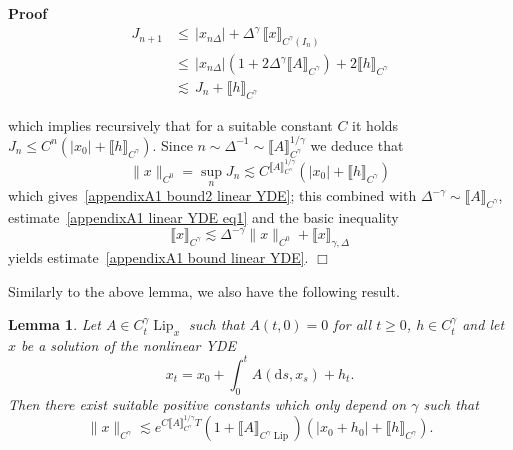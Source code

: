 \documentclass[10pt]{article}
\newcommand{\mathd}{\mathrm{d}}
\newcommand{\tmop}[1]{\ensuremath{\operatorname{#1}}}
\newenvironment{proof}{\noindent\textbf{Proof\ }}{\hspace*{\fill}$\Box$\medskip}
\newtheorem{lemma}{Lemma}
\begin{document}
\begin{proof}
  \begin{align*}
    J_{n + 1} & \leqslant \, | x_{n \Delta} | + \Delta^{\gamma} \, \llbracket
    x \rrbracket_{C^{\gamma} (I_n)}\\
    & \leqslant \, | x_{n \Delta} | (1 + 2 \Delta^{\gamma} \llbracket A
    \rrbracket_{C^{\gamma}}) + 2 \llbracket h \rrbracket_{C^{\gamma}}\\
    & \lesssim \, J_n + \llbracket h \rrbracket_{C^{\gamma}}
  \end{align*}
  
  which implies recursively that for a suitable constant $C$ it holds $J_n
  \leqslant C^n (| x_0 | + \llbracket h \rrbracket_{C^{\gamma}})$. Since $n
  \sim \Delta^{- 1} \sim \llbracket A \rrbracket_{C^{\gamma}}^{1 / \gamma}$ we
  deduce that
  \[ \| x \|_{C^0} = \sup_n J_n \lesssim C^{\llbracket A \rrbracket^{1 /
     \gamma}_{C^{\gamma}}} (| x_0 | + \llbracket h \rrbracket_{C^{\gamma}}) \]
  which gives~{\eqref{appendixA1 bound2 linear YDE}}; this combined with
  $\Delta^{- \gamma} \sim \llbracket A \rrbracket_{C^{\gamma}}$,
  estimate~{\eqref{appendixA1 linear YDE eq1}} and the basic inequality
  \[ \llbracket x \rrbracket_{C^{\gamma}} \lesssim \Delta^{- \gamma} \| x
     \|_{C^0} + \llbracket x \rrbracket_{\gamma, \Delta} \]
  yields estimate~{\eqref{appendixA1 bound linear YDE}}.
\end{proof}

Similarly to the above lemma, we also have the following result.

\begin{lemma}
  \label{appendixA1 lemma bound nonlinear YDE}Let $A \in C^{\gamma}_t
  \tmop{Lip}_x$ such that $A (t, 0) = 0$ for all $t \geqslant 0$, $h \in
  C^{\gamma}_t$ and let $x$ be a solution of the nonlinear YDE
  \[ x_t = x_0 + \int_0^t A (\mathd s, x_s) + h_t . \]
  Then there exist suitable positive constants which only depend on $\gamma$
  such that
  \begin{equation}
    \| x \|_{C^{\gamma}} \lesssim e^{C \llbracket A \rrbracket_{C^{\gamma}}^{1
    / \gamma} T} (1 + \llbracket A \rrbracket_{C^{\gamma} \tmop{Lip}}) (| x_0
    + h_0 | + \llbracket h \rrbracket_{C^{\gamma}}) . \label{appendixA1 bound
    nonlinear YDE}
  \end{equation}
\end{lemma}
\end{document}
